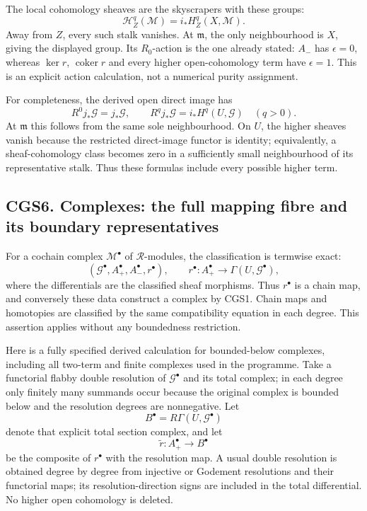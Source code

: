 The local cohomology sheaves are the skyscrapers with these groups: \[
 \mathcal H_Z^q(\mathcal M)=i_*H_Z^q(X,\mathcal M).
\tag{CGS5.5}
\] Away from \(Z\), every such stalk vanishes. At \(\mathfrak m\), the
only neighbourhood is \(X\), giving the displayed group. Its
\(R_0\)-action is the one already stated: \(A_-\) has \(\epsilon=0\),
whereas \(\ker r\), \(\operatorname{coker}r\) and every higher
open-cohomology term have \(\epsilon=1\). This is an explicit action
calculation, not a numerical purity assignment.

For completeness, the derived open direct image has \[
 R^0j_*\mathcal G=j_*\mathcal G,\qquad
 R^qj_*\mathcal G=i_*H^q(U,\mathcal G)\quad(q>0).
\tag{CGS5.6}
\] At \(\mathfrak m\) this follows from the same sole neighbourhood. On
\(U\), the higher sheaves vanish because the restricted direct-image
functor is identity; equivalently, a sheaf-cohomology class becomes zero
in a sufficiently small neighbourhood of its representative stalk. Thus
these formulas include every possible higher term.

\subsection{CGS6. Complexes: the full mapping fibre and its boundary
representatives}\label{cgs6.-complexes-the-full-mapping-fibre-and-its-boundary-representatives}

For a cochain complex \(\mathcal M^\bullet\) of \(\mathcal R\)-modules,
the classification is termwise exact: \[
 (\mathcal G^\bullet,A_+^\bullet,A_-^\bullet,r^\bullet),
\qquad
 r^\bullet:A_+^\bullet\to\Gamma(U,\mathcal G^\bullet),
\tag{CGS6.1}
\] where the differentials are the classified sheaf morphisms. Thus
\(r^\bullet\) is a chain map, and conversely these data construct a
complex by CGS1. Chain maps and homotopies are classified by the same
compatibility equation in each degree. This assertion applies without
any boundedness restriction.

Here is a fully specified derived calculation for bounded-below
complexes, including all two-term and finite complexes used in the
programme. Take a functorial flabby double resolution of
\(\mathcal G^\bullet\) and its total complex; in each degree only
finitely many summands occur because the original complex is bounded
below and the resolution degrees are nonnegative. Let \[
 B^\bullet=R\Gamma(U,\mathcal G^\bullet)
\] denote that explicit total section complex, and let \[
 \widetilde r:A_+^\bullet\longrightarrow B^\bullet
\tag{CGS6.2}
\] be the composite of \(r^\bullet\) with the resolution map. A usual
double resolution is obtained degree by degree from injective or
Godement resolutions and their functorial maps; its resolution-direction
signs are included in the total differential. No higher open cohomology
is deleted.

